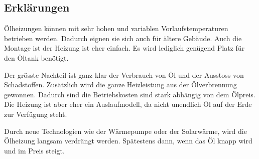 \subsection{Erklärungen}

Ölheizungen können mit sehr hohen und variablen Vorlaufstemperaturen betrieben werden. Dadurch eignen sie sich auch für ältere Gebäude. 
Auch die Montage ist der Heizung ist eher einfach. Es wird lediglich genügend Platz für den Öltank benötigt.

Der grösste Nachteil ist ganz klar der Verbrauch von Öl und der Ausstoss von Schadstoffen. Zusätzlich wird die ganze Heizleistung aus der Ölverbrennung gewonnen.
Dadurch sind die Betriebskosten sind stark abhängig von dem Ölpreis.
Die Heizung ist aber eher ein Auslaufmodell, da nicht unendlich Öl auf der Erde zur Verfügung steht.

Durch neue Technologien wie der Wärmepumpe oder der Solarwärme, wird die Ölheizung langsam verdrängt werden. Spätestens dann, wenn das Öl knapp wird und im Preis steigt.


